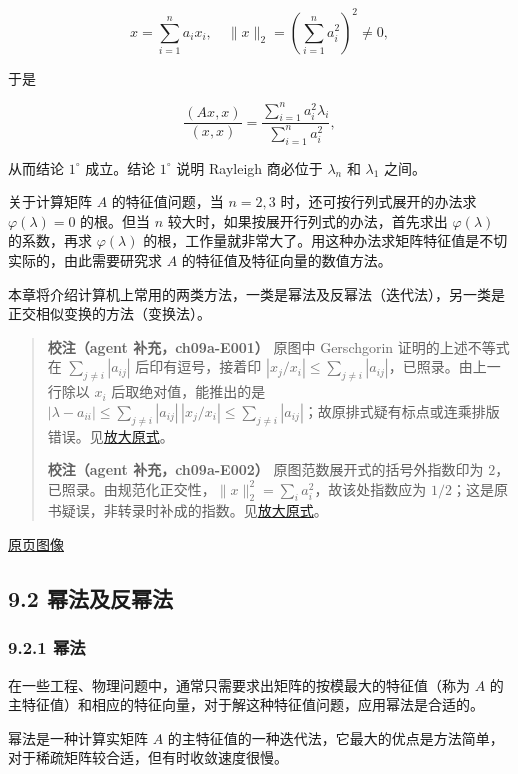 \documentclass[
  10pt,
  fontset=fandol]{ctexart}
\begin{document}
\[
x=\sum_{i=1}^na_ix_i,\quad \|x\|_2=\left(\sum_{i=1}^na_i^2\right)^2\ne0,
\]

于是

\[
\frac{(Ax,x)}{(x,x)}=\frac{\displaystyle\sum_{i=1}^na_i^2\lambda_i}{\displaystyle\sum_{i=1}^na_i^2},
\]

从而结论 \(1^\circ\) 成立。结论 \(1^\circ\) 说明 Rayleigh 商必位于 \(\lambda_n\) 和 \(\lambda_1\) 之间。

关于计算矩阵 \(A\) 的特征值问题，当 \(n=2,3\) 时，还可按行列式展开的办法求 \(\varphi(\lambda)=0\) 的根。但当 \(n\) 较大时，如果按展开行列式的办法，首先求出 \(\varphi(\lambda)\) 的系数，再求 \(\varphi(\lambda)\) 的根，工作量就非常大了。用这种办法求矩阵特征值是不切实际的，由此需要研究求 \(A\) 的特征值及特征向量的数值方法。

本章将介绍计算机上常用的两类方法，一类是幂法及反幂法（迭代法），另一类是正交相似变换的方法（变换法）。

\begin{quote}
\textbf{校注（agent 补充，ch09a-E001）} 原图中 Gerschgorin 证明的上述不等式在 \(\sum_{j\ne i}|a_{ij}|\) 后印有逗号，接着印 \(|x_j/x_i|\leq\sum_{j\ne i}|a_{ij}|\)，已照录。由上一行除以 \(x_i\) 后取绝对值，能推出的是 \(|\lambda-a_{ii}|\leq\sum_{j\ne i}|a_{ij}|\,|x_j/x_i|\leq\sum_{j\ne i}|a_{ij}|\)；故原排式疑有标点或连乘排版错误。见\href{../assets/ch09a/review-p234-gershgorin.png}{放大原式}。

\textbf{校注（agent 补充，ch09a-E002）} 原图范数展开式的括号外指数印为 \(2\)，已照录。由规范化正交性，\(\|x\|_2^2=\sum_i a_i^2\)，故该处指数应为 \(1/2\)；这是原书疑误，非转录时补成的指数。见\href{../assets/ch09a/review-p234-norm.png}{放大原式}。
\end{quote}

\href{../../source-images/pdf-235.jpeg}{原页图像}

\subsection{9.2 幂法及反幂法}\label{ux5e42ux6cd5ux53caux53cdux5e42ux6cd5}

\subsubsection{9.2.1 幂法}\label{ux5e42ux6cd5}

在一些工程、物理问题中，通常只需要求出矩阵的按模最大的特征值（称为 \(A\) 的主特征值）和相应的特征向量，对于解这种特征值问题，应用幂法是合适的。

幂法是一种计算实矩阵 \(A\) 的主特征值的一种迭代法，它最大的优点是方法简单，对于稀疏矩阵较合适，但有时收敛速度很慢。
\end{document}
